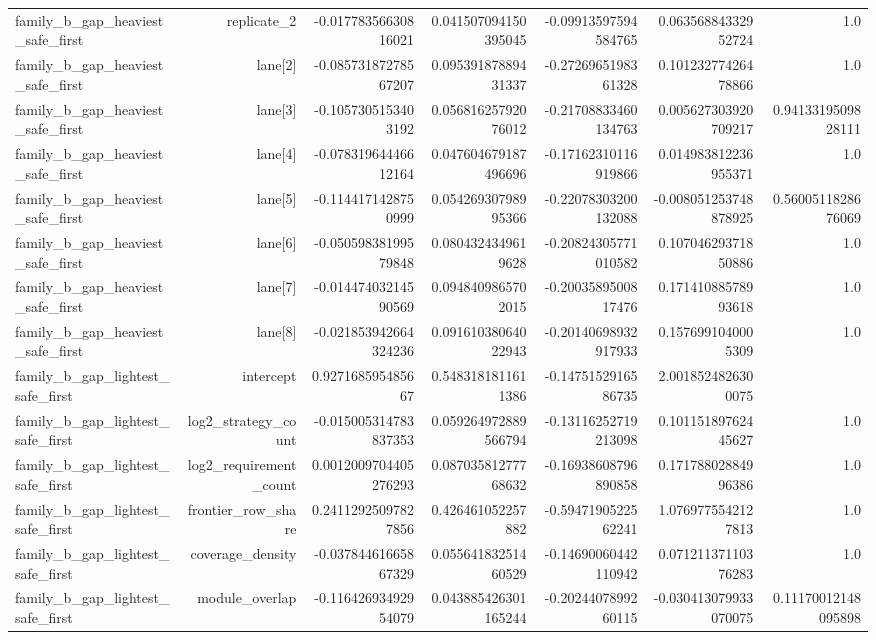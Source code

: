 {\begin{longtable}{lrrrrrr}
family\_b\_gap\_heaviest\_safe\_first & replicate\_2 & -0.01778356630816021 & 0.041507094150395045 & -0.09913597594584765 & 0.06356884332952724 & 1.0 \\
family\_b\_gap\_heaviest\_safe\_first & lane[2] & -0.08573187278567207 & 0.09539187889431337 & -0.2726965198361328 & 0.10123277426478866 & 1.0 \\
family\_b\_gap\_heaviest\_safe\_first & lane[3] & -0.1057305153403192 & 0.05681625792076012 & -0.21708833460134763 & 0.005627303920709217 & 0.9413319509828111 \\
family\_b\_gap\_heaviest\_safe\_first & lane[4] & -0.07831964446612164 & 0.047604679187496696 & -0.17162310116919866 & 0.014983812236955371 & 1.0 \\
family\_b\_gap\_heaviest\_safe\_first & lane[5] & -0.1144171428750999 & 0.05426930798995366 & -0.22078303200132088 & -0.008051253748878925 & 0.5600511828676069 \\
family\_b\_gap\_heaviest\_safe\_first & lane[6] & -0.05059838199579848 & 0.0804324349619628 & -0.20824305771010582 & 0.10704629371850886 & 1.0 \\
family\_b\_gap\_heaviest\_safe\_first & lane[7] & -0.01447403214590569 & 0.0948409865702015 & -0.2003589500817476 & 0.17141088578993618 & 1.0 \\
family\_b\_gap\_heaviest\_safe\_first & lane[8] & -0.021853942664324236 & 0.09161038064022943 & -0.20140698932917933 & 0.1576991040005309 & 1.0 \\
family\_b\_gap\_lightest\_safe\_first & intercept & 0.927168595485667 & 0.5483181811611386 & -0.1475152916586735 & 2.0018524826300075 &  \\
family\_b\_gap\_lightest\_safe\_first & log2\_strategy\_count & -0.015005314783837353 & 0.059264972889566794 & -0.13116252719213098 & 0.10115189762445627 & 1.0 \\
family\_b\_gap\_lightest\_safe\_first & log2\_requirement\_count & 0.0012009704405276293 & 0.08703581277768632 & -0.16938608796890858 & 0.17178802884996386 & 1.0 \\
family\_b\_gap\_lightest\_safe\_first & frontier\_row\_share & 0.24112925097827856 & 0.426461052257882 & -0.5947190522562241 & 1.0769775542127813 & 1.0 \\
family\_b\_gap\_lightest\_safe\_first & coverage\_density & -0.03784461665867329 & 0.05564183251460529 & -0.14690060442110942 & 0.07121137110376283 & 1.0 \\
family\_b\_gap\_lightest\_safe\_first & module\_overlap & -0.11642693492954079 & 0.043885426301165244 & -0.2024407899260115 & -0.030413079933070075 & 0.11170012148095898 \\

\end{longtable}}
